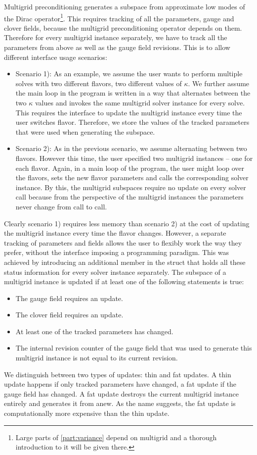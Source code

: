 Multigrid preconditioning generates a subspace from approximate low modes of the Dirac operator\footnote{Large parts of \cref{part:variance} depend on multigrid and a thorough introduction to it will be given there.}.
This requires tracking of all the parameters, gauge and clover fields, because the multigrid preconditioning operator depends on them.
Therefore for every multigrid instance separately, we have to track all the parameters from above as well as the gauge field revisions.
This is to allow different interface usage scenarios:
\begin{itemize}
  \item Scenario 1): As an example, we assume the user wants to perform multiple solves with two different flavors, \ie two different values of $\kappa$. We further assume the main loop in the program is written in a way that alternates between the two $\kappa$ values and invokes the same multigrid solver instance for every solve. This requires the interface to update the multigrid instance every time the user switches flavor. Therefore, we store the values of the tracked parameters that were used when generating the subspace.
  \item Scenario 2): As in the previous scenario, we assume alternating between two flavors. However this time, the user specified two multigrid instances -- one for each flavor. Again, in a main loop of the program, the user might loop over the flavors, sets the new flavor parameters and calls the corresponding solver instance. By this, the multigrid subspaces require no update on every solver call because from the perspective of the multigrid instances the parameters never change from call to call.
\end{itemize}
Clearly scenario 1) requires less memory than scenario 2) at the cost of updating the multigrid instance every time the flavor changes.
However, a separate tracking of parameters and fields allows the user to flexibly work the way they prefer, without the interface imposing a programming paradigm.
This was achieved by introducing an additional member in the  struct that holds all these status information for every solver instance separately.
The subspace of a multigrid instance is updated if at least one of the following statements is true:
\begin{itemize}
  \item The gauge field requires an update.
  \item The clover field requires an update.
  \item At least one of the tracked parameters has changed.
  \item The internal revision counter of the gauge field that was used to generate this multigrid instance is not equal to its current revision.
\end{itemize}
We distinguish between two types of updates: thin and fat updates.
A thin update happens if only tracked parameters have changed, a fat update if the gauge field has changed.
A fat update destroys the current multigrid instance entirely and generates it from anew.
As the name suggests, the fat update is computationally more expensive than the thin update.

